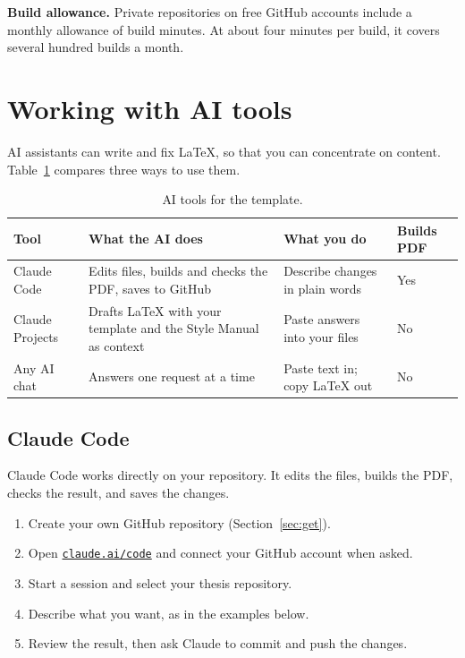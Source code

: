 \documentclass[11pt,a4paper]{article}
\newcommand\thd[1]{\bfseries #1}
\begin{document}
\textbf{Build allowance.} Private repositories on free GitHub accounts include a
monthly allowance of build minutes. At about four minutes per build, it covers
several hundred builds a month.

\section{Working with AI tools}\label{sec:ai}

AI assistants can write and fix LaTeX, so that you can concentrate on content.
Table~\ref{tab:aitools} compares three ways to use them.

\begin{table}[htbp]
\caption{AI tools for the template.}
\label{tab:aitools}
\small
\begin{tabularx}{\textwidth}{@{}p{26mm}XXp{15mm}@{}}
\toprule
\thd{Tool} & \thd{What the AI does} & \thd{What you do} & \thd{Builds PDF} \\
\midrule
Claude Code     & Edits files, builds and checks the PDF, saves to GitHub & Describe changes in plain words & Yes \\
Claude Projects & Drafts LaTeX with your template and the Style Manual as context & Paste answers into your files & No \\
Any AI chat     & Answers one request at a time                           & Paste text in; copy LaTeX out     & No \\
\bottomrule
\end{tabularx}
\end{table}

\subsection{Claude Code}\label{sec:claudecode}

Claude Code works directly on your repository. It edits the files, builds the
PDF, checks the result, and saves the changes.

\begin{enumerate}
  \item Create your own GitHub repository (Section~\ref{sec:get}).
  \item Open \href{https://claude.ai/code}{\texttt{claude.ai/code}} and connect
        your GitHub account when asked.
  \item Start a session and select your thesis repository.
  \item Describe what you want, as in the examples below.
  \item Review the result, then ask Claude to commit and push the changes.
\end{enumerate}
\end{document}
